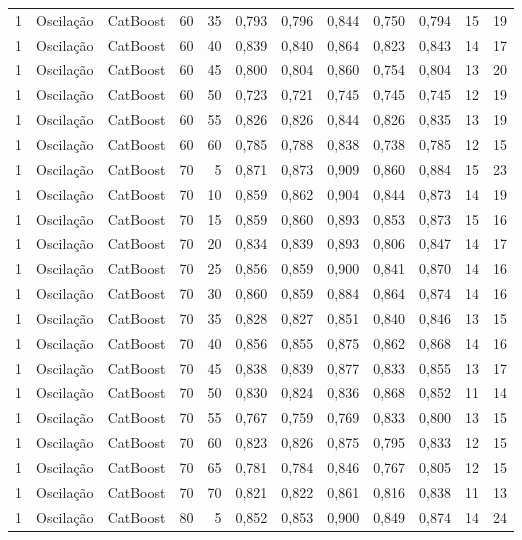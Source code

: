 \begin{longtable}{ccclrrrrrrrr}
1 & Oscilação & CatBoost & 60 & 35 & 0,793 & 0,796 & 0,844 & 0,750 & 0,794 & 15 & 19 \\
1 & Oscilação & CatBoost & 60 & 40 & 0,839 & 0,840 & 0,864 & 0,823 & 0,843 & 14 & 17 \\
1 & Oscilação & CatBoost & 60 & 45 & 0,800 & 0,804 & 0,860 & 0,754 & 0,804 & 13 & 20 \\
1 & Oscilação & CatBoost & 60 & 50 & 0,723 & 0,721 & 0,745 & 0,745 & 0,745 & 12 & 19 \\
1 & Oscilação & CatBoost & 60 & 55 & 0,826 & 0,826 & 0,844 & 0,826 & 0,835 & 13 & 19 \\
1 & Oscilação & CatBoost & 60 & 60 & 0,785 & 0,788 & 0,838 & 0,738 & 0,785 & 12 & 15 \\
1 & Oscilação & CatBoost & 70 & 5 & 0,871 & 0,873 & 0,909 & 0,860 & 0,884 & 15 & 23 \\
1 & Oscilação & CatBoost & 70 & 10 & 0,859 & 0,862 & 0,904 & 0,844 & 0,873 & 14 & 19 \\
1 & Oscilação & CatBoost & 70 & 15 & 0,859 & 0,860 & 0,893 & 0,853 & 0,873 & 15 & 16 \\
1 & Oscilação & CatBoost & 70 & 20 & 0,834 & 0,839 & 0,893 & 0,806 & 0,847 & 14 & 17 \\
1 & Oscilação & CatBoost & 70 & 25 & 0,856 & 0,859 & 0,900 & 0,841 & 0,870 & 14 & 16 \\
1 & Oscilação & CatBoost & 70 & 30 & 0,860 & 0,859 & 0,884 & 0,864 & 0,874 & 14 & 16 \\
1 & Oscilação & CatBoost & 70 & 35 & 0,828 & 0,827 & 0,851 & 0,840 & 0,846 & 13 & 15 \\
1 & Oscilação & CatBoost & 70 & 40 & 0,856 & 0,855 & 0,875 & 0,862 & 0,868 & 14 & 16 \\
1 & Oscilação & CatBoost & 70 & 45 & 0,838 & 0,839 & 0,877 & 0,833 & 0,855 & 13 & 17 \\
1 & Oscilação & CatBoost & 70 & 50 & 0,830 & 0,824 & 0,836 & 0,868 & 0,852 & 11 & 14 \\
1 & Oscilação & CatBoost & 70 & 55 & 0,767 & 0,759 & 0,769 & 0,833 & 0,800 & 13 & 15 \\
1 & Oscilação & CatBoost & 70 & 60 & 0,823 & 0,826 & 0,875 & 0,795 & 0,833 & 12 & 15 \\
1 & Oscilação & CatBoost & 70 & 65 & 0,781 & 0,784 & 0,846 & 0,767 & 0,805 & 12 & 15 \\
1 & Oscilação & CatBoost & 70 & 70 & 0,821 & 0,822 & 0,861 & 0,816 & 0,838 & 11 & 13 \\
1 & Oscilação & CatBoost & 80 & 5 & 0,852 & 0,853 & 0,900 & 0,849 & 0,874 & 14 & 24 \\

\end{longtable}
